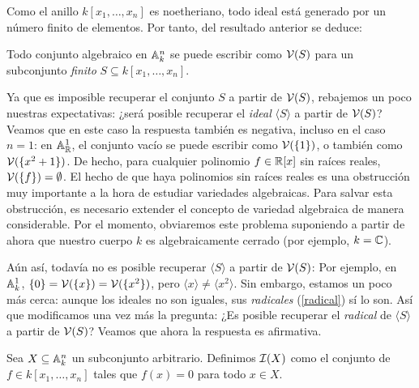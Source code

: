 \documentclass[ACGA.tex]{subfiles}
\begin{document}
Como el anillo $k[x_1,\ldots,x_n]$ es noetheriano, todo ideal está generado por un número finito de elementos. Por tanto, del resultado anterior se deduce:

\begin{coro}
 Todo conjunto algebraico en $\mathbb{A}^n_k$ se puede escribir como $\mathcal{V}(S)$ para un subconjunto \emph{finito} $S\subseteq k[x_1,\ldots,x_n]$.
\end{coro}

Ya que es imposible recuperar el conjunto $S$ a partir de $\mathcal{V}(S)$, rebajemos un poco nuestras expectativas: ¿será posible recuperar el \emph{ideal} $\langle S\rangle$ a partir de $\mathcal{V}(S)$? Veamos que en este caso la respuesta también es negativa, incluso en el caso $n=1$: en $\mathbb{A}^1_{\mathbb{R}}$, el conjunto vacío se puede escribir como $\mathcal{V}(\{1\})$, o también como $\mathcal{V}(\{x^2+1\})$. De hecho, para cualquier polinomio $f\in \mathbb{R}[x]$ sin raíces reales, $\mathcal{V}(\{f\})=\emptyset$. El hecho de que haya polinomios sin raíces reales es una obstrucción muy importante a la hora de estudiar variedades algebraicas. Para salvar esta obstrucción, es necesario extender el concepto de variedad algebraica de manera considerable. Por el momento, obviaremos este problema suponiendo a partir de ahora que nuestro cuerpo $k$ es algebraicamente cerrado (por ejemplo, $k=\mathbb{C}$).

Aún así, todavía no es posible recuperar $\langle S\rangle$ a partir de $\mathcal{V}(S)$: Por ejemplo, en $\mathbb{A}^1_k$, $\{0\}=\mathcal{V}(\{x\})=\mathcal{V}(\{x^2\})$, pero $\langle x\rangle\neq\langle x^2\rangle$. Sin embargo, estamos un poco más cerca: aunque los ideales no son iguales, sus \emph{radicales} (\ref{radical}) sí lo son. Así que modificamos una vez más la pregunta: ¿Es posible recuperar el \emph{radical} de $\langle S\rangle$ a partir de $\mathcal{V}(S)$? Veamos que ahora la respuesta es afirmativa.

Sea $X\subseteq \mathbb{A}^n_k$ un subconjunto arbitrario. Definimos $\mathcal{I}(X)$ como el conjunto de $f\in k[x_1,\ldots,x_n]$ tales que $f(x)=0$ para todo $x\in X$. 
\end{document}
